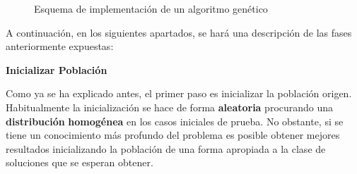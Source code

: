 \documentclass[
  a4paper,
  DIV=11,
  numbers=noendperiod]{scrreprt}
\begin{document}
\begin{figure}


\caption{\label{fig-esquema-genetico}Esquema de implementación de un
algoritmo genético}

\end{figure}%

A continuación, en los siguientes apartados, se hará una descripción de
las fases anteriormente expuestas:

\textbf{Inicializar Población}

Como ya se ha explicado antes, el primer paso es inicializar la
población origen. Habitualmente la inicialización se hace de forma
\textbf{aleatoria} procurando una \textbf{distribución}
\textbf{homogénea} en los casos iniciales de prueba. No obstante, si se
tiene un conocimiento más profundo del problema es posible obtener
mejores resultados inicializando la población de una forma apropiada a
la clase de soluciones que se esperan obtener.
\end{document}
